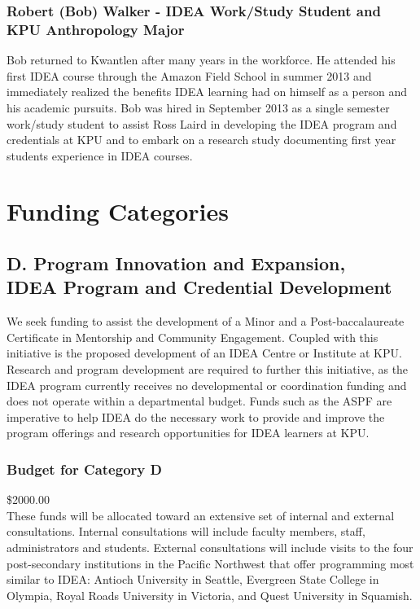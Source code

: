 \documentclass[11pt, letterpaper]{article}
\begin{document}
\subsubsection{Robert (Bob) Walker - IDEA Work/Study Student and KPU
Anthropology Major}

Bob returned to Kwantlen after many years in the workforce. He attended
his first IDEA course through the Amazon Field School in summer 2013 and
immediately realized the benefits IDEA learning had on himself as a
person and his academic pursuits. Bob was hired in September 2013 as a
single semester work/study student to assist Ross Laird in developing
the IDEA program and credentials at KPU and to embark on a research
study documenting first year students experience in IDEA courses.

\section{Funding Categories}

\subsection{D. Program Innovation and Expansion,\\
IDEA Program and Credential Development}

We seek funding to assist the development of a Minor and a Post-baccalaureate Certificate in Mentorship and Community Engagement.
Coupled with this initiative is the proposed development of an IDEA
Centre or Institute at KPU. Research and program development are
required to further this initiative, as the IDEA program currently
receives no developmental or coordination funding and does not operate
within a departmental budget. Funds such as the ASPF are imperative to
help IDEA do the necessary work to provide and improve the program
offerings and research opportunities for IDEA learners at KPU.

\subsubsection{Budget for Category D}

\$2000.00\\[1em]
\noindent
These funds will be allocated toward an extensive set of internal and
external consultations. Internal consultations will include faculty
members, staff, administrators and students. External consultations will
include visits to the four post-secondary institutions in the Pacific
Northwest that offer programming most similar to IDEA: Antioch
University in Seattle, Evergreen State College in Olympia, Royal Roads
University in Victoria, and Quest University in Squamish.
\end{document}
